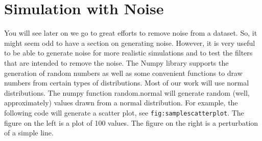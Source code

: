 \hypertarget{simulation-with-noise}{%
\section{Simulation with Noise}\label{simulation-with-noise}}

You will see later on we go to great efforts to remove noise from a
dataset. So, it might seem odd to have a section on generating noise.
However, it is very useful to be able to generate noise for more
realistic simulations and to test the filters that are intended to
remove the noise. The Numpy library supports the generation of random
numbers as well as some convenient functions to draw numbers from
certain types of distributions. Most of our work will use normal
distributions. The numpy function random.normal will generate random
(well, approximately) values drawn from a normal distribution. For
example, the following code will generate a scatter plot, see
\texttt{fig:samplescatterplot}. The figure on the left is a plot of 100
values. The figure on the right is a perturbation of a simple line.

